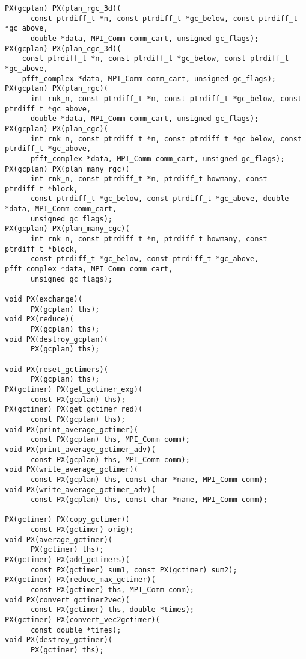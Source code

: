 \begin{lstlisting}
PX(gcplan) PX(plan_rgc_3d)(
      const ptrdiff_t *n, const ptrdiff_t *gc_below, const ptrdiff_t *gc_above,
      double *data, MPI_Comm comm_cart, unsigned gc_flags);
PX(gcplan) PX(plan_cgc_3d)(
    const ptrdiff_t *n, const ptrdiff_t *gc_below, const ptrdiff_t *gc_above,
    pfft_complex *data, MPI_Comm comm_cart, unsigned gc_flags);
PX(gcplan) PX(plan_rgc)(
      int rnk_n, const ptrdiff_t *n, const ptrdiff_t *gc_below, const ptrdiff_t *gc_above,
      double *data, MPI_Comm comm_cart, unsigned gc_flags);
PX(gcplan) PX(plan_cgc)(
      int rnk_n, const ptrdiff_t *n, const ptrdiff_t *gc_below, const ptrdiff_t *gc_above,
      pfft_complex *data, MPI_Comm comm_cart, unsigned gc_flags);
PX(gcplan) PX(plan_many_rgc)(
      int rnk_n, const ptrdiff_t *n, ptrdiff_t howmany, const ptrdiff_t *block,
      const ptrdiff_t *gc_below, const ptrdiff_t *gc_above, double *data, MPI_Comm comm_cart,
      unsigned gc_flags);
PX(gcplan) PX(plan_many_cgc)(
      int rnk_n, const ptrdiff_t *n, ptrdiff_t howmany, const ptrdiff_t *block,
      const ptrdiff_t *gc_below, const ptrdiff_t *gc_above, pfft_complex *data, MPI_Comm comm_cart,
      unsigned gc_flags);

void PX(exchange)(
      PX(gcplan) ths);
void PX(reduce)(
      PX(gcplan) ths);
void PX(destroy_gcplan)(
      PX(gcplan) ths);

void PX(reset_gctimers)(
      PX(gcplan) ths);
PX(gctimer) PX(get_gctimer_exg)(
      const PX(gcplan) ths);
PX(gctimer) PX(get_gctimer_red)(
      const PX(gcplan) ths);
void PX(print_average_gctimer)(
      const PX(gcplan) ths, MPI_Comm comm);
void PX(print_average_gctimer_adv)(
      const PX(gcplan) ths, MPI_Comm comm);
void PX(write_average_gctimer)(
      const PX(gcplan) ths, const char *name, MPI_Comm comm);
void PX(write_average_gctimer_adv)(
      const PX(gcplan) ths, const char *name, MPI_Comm comm);

PX(gctimer) PX(copy_gctimer)(
      const PX(gctimer) orig);
void PX(average_gctimer)(
      PX(gctimer) ths);
PX(gctimer) PX(add_gctimers)(
      const PX(gctimer) sum1, const PX(gctimer) sum2);
PX(gctimer) PX(reduce_max_gctimer)(
      const PX(gctimer) ths, MPI_Comm comm);
void PX(convert_gctimer2vec)(
      const PX(gctimer) ths, double *times);
PX(gctimer) PX(convert_vec2gctimer)(
      const double *times);
void PX(destroy_gctimer)(
      PX(gctimer) ths);
\end{lstlisting}

